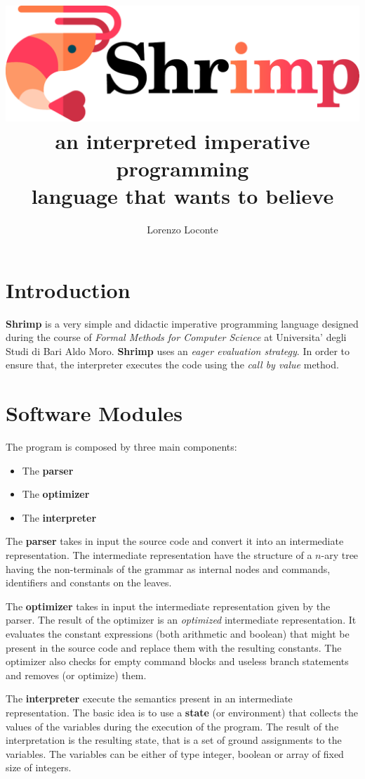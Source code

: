 \documentclass[12pt,a4paper]{article}
\date{}
\title{
    \includegraphics[width=0.67\linewidth]{logo.pdf} \\
    an interpreted imperative programming \\ language that wants to believe
}
\author{Lorenzo Loconte}
\begin{document}
\maketitle

\section*{Introduction}
\textbf{Shrimp} is a very simple and didactic imperative programming language designed during the course of \textit{Formal Methods for Computer Science} at Universita' degli Studi di Bari Aldo Moro.
\textbf{Shrimp} uses an \textit{eager evaluation strategy}.
In order to ensure that, the interpreter executes the code using the \textit{call by value} method.

\section*{Software Modules}
The program is composed by three main components:
\begin{itemize}
    \item The \textbf{parser}
    \item The \textbf{optimizer}
    \item The \textbf{interpreter}
\end{itemize}

The \textbf{parser} takes in input the source code and convert it into an intermediate representation.
The intermediate representation have the structure of a $n$-ary tree having the non-terminals of the grammar as internal nodes and commands, identifiers and constants on the leaves.

The \textbf{optimizer} takes in input the intermediate representation given by the parser.
The result of the optimizer is an \textit{optimized} intermediate representation.
It evaluates the constant expressions (both arithmetic and boolean) that might be present in the source code and replace them with the resulting constants.
The optimizer also checks for empty command blocks and useless branch statements and removes (or optimize) them.

The \textbf{interpreter} execute the semantics present in an intermediate representation.
The basic idea is to use a \textbf{state} (or environment) that collects the values of the variables during the execution of the program.
The result of the interpretation is the resulting state, that is a set of ground assignments to the variables.
The variables can be either of type integer, boolean or array of fixed size of integers.
\end{document}
